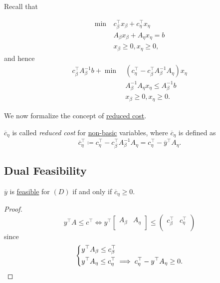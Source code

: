 Recall that
\begin{prev}
	\[
		\begin{aligned}
			\min~ & c^{\top}_{\beta}x_{\beta} + c^{\top}_{\eta}x_{\eta} \\
			      & A_{\beta}x_{\beta} + A_{\eta}x_{\eta} = b           \\
			      & x_{\beta}\geq 0, x_{\eta}\geq 0,
		\end{aligned}
	\]
	and hence
	\[
		\begin{aligned}
			c^{\top}_{\beta}A^{-1}_{\beta}b + \min~ & (c_{\eta}^{\top} - c_{\beta}^{\top}A^{-1}_{\beta}A_{\eta})x_{\eta} \\
			                                        & A^{-1}_{\beta}A_{\eta}x_{\eta} \leq A^{-1}_{\beta}b                \\
			                                        & x_{\beta}\geq 0, x_{\eta}\geq 0.
		\end{aligned}
	\]
\end{prev}

We now formalize the concept of \hyperref[note:reduced-cost]{reduced cost}.
\begin{definition}\label{def:reduced-cost}
	\(\overline{c}_{\eta}\) is called \emph{reduced cost} for \hyperref[def:non-basic]{non-basic} variables, where \(\overline{c}_{\eta}\) is defined as
	\[
		\overline{c}_{\eta}^{\top} \coloneqq c_{\eta}^{\top} - c_{\beta}^{\top} A^{-1}_{\beta}A_{\eta} = c_{\eta}^{\top} - \overline{y}^{\top}A_{\eta}.
	\]
\end{definition}

\subsection{Dual Feasibility}
\begin{lemma}\label{lma:lec7-2}
	\(\overline{y}\) is \hyperref[def:feasible-solution]{feasible} for \((D)\) if and only if \(\overline{c}_{\eta}\geq 0\).
\end{lemma}
\begin{proof}
	\[
		y^{\top}A\leq c^{\top} \iff y^{\top}\begin{bmatrix}
			A_{\beta} & A_{\eta} \\
		\end{bmatrix}\leq \begin{pmatrix}
			c_{\beta}^{\top} & c_{\eta}^{\top} \\
		\end{pmatrix}
	\]
	since
	\[
		\begin{dcases}
			y^{\top} A_{\beta} \leq c_{\beta}^{\top} \\
			y^{\top} A_{\eta}  \leq c_{\eta}^{\top} \implies c_{\eta}^{\top} - y^{\top}A_{\eta}\geq 0.
		\end{dcases}
	\]
\end{proof}

